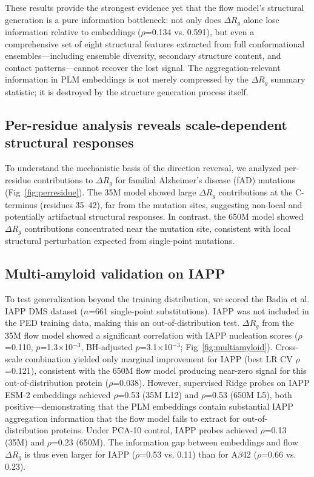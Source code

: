\documentclass[10pt,letterpaper]{article}
\begin{document}
These results provide the strongest evidence yet that the flow model's structural generation is a pure information bottleneck: not only does $\Delta R_g$ alone lose information relative to embeddings ($\rho$=0.134 vs. 0.591), but even a comprehensive set of eight structural features extracted from full conformational ensembles---including ensemble diversity, secondary structure content, and contact patterns---cannot recover the lost signal. The aggregation-relevant information in PLM embeddings is not merely compressed by the $\Delta R_g$ summary statistic; it is destroyed by the structure generation process itself.

\subsection*{Per-residue analysis reveals scale-dependent structural responses}

To understand the mechanistic basis of the direction reversal, we analyzed per-residue contributions to $\Delta R_g$ for familial Alzheimer's disease (fAD) mutations (Fig~\ref{fig:perresidue}). The 35M model showed large $\Delta R_g$ contributions at the C-terminus (residues 35--42), far from the mutation sites, suggesting non-local and potentially artifactual structural responses. In contrast, the 650M model showed $\Delta R_g$ contributions concentrated near the mutation site, consistent with local structural perturbation expected from single-point mutations.

\subsection*{Multi-amyloid validation on IAPP}

To test generalization beyond the training distribution, we scored the Badia et al. IAPP DMS dataset \cite{badia2026} ($n$=661 single-point substitutions). IAPP was not included in the PED training data, making this an out-of-distribution test. $\Delta R_g$ from the 35M flow model showed a significant correlation with IAPP nucleation scores ($\rho$=0.110, $p$=1.3$\times$10$^{-3}$, BH-adjusted $p$=3.1$\times$10$^{-3}$; Fig~\ref{fig:multiamyloid}). Cross-scale combination yielded only marginal improvement for IAPP (best LR CV $\rho$=0.121), consistent with the 650M flow model producing near-zero signal for this out-of-distribution protein ($\rho$=0.038). However, supervised Ridge probes on IAPP ESM-2 embeddings achieved $\rho$=0.53 (35M L12) and $\rho$=0.53 (650M L5), both positive---demonstrating that the PLM embeddings contain substantial IAPP aggregation information that the flow model fails to extract for out-of-distribution proteins. Under PCA-10 control, IAPP probes achieved $\rho$=0.13 (35M) and $\rho$=0.23 (650M). The information gap between embeddings and flow $\Delta R_g$ is thus even larger for IAPP ($\rho$=0.53 vs. 0.11) than for A$\beta$42 ($\rho$=0.66 vs. 0.23).
\end{document}
